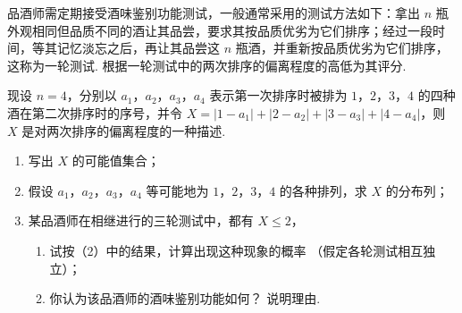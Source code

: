 \begin{problem}
品酒师需定期接受酒味鉴别功能测试，一般通常采用的测试方法如下：拿出 \(n\) 瓶外观相同但品质不同的酒让其品尝，要求其按品质优劣为它们排序；经过一段时间，等其记忆淡忘之后，再让其品尝这 \(n\) 瓶酒，并重新按品质优劣为它们排序，这称为一轮测试. 根据一轮测试中的两次排序的偏离程度的高低为其评分.

现设 \(n = 4\)，分别以 \(a_{1}\)，\(a_{2}\)，\(a_{3}\)，\(a_{4}\) 表示第一次排序时被排为 \(1\)，\(2\)，\(3\)，\(4\) 的四种酒在第二次排序时的序号，并令 \(X = |1 - a_{1}| + |2 - a_{2}| + |3 - a_{3}| + |4 - a_{4}|\)，则 \(X\) 是对两次排序的偏离程度的一种描述.

\begin{enumerate}
\item 写出 \(X\) 的可能值集合；
\item 假设 \(a_{1}\)，\(a_{2}\)，\(a_{3}\)，\(a_{4}\) 等可能地为 \(1\)，\(2\)，\(3\)，\(4\) 的各种排列，求 \(X\) 的分布列；
\item 某品酒师在相继进行的三轮测试中，都有 \(X \leqslant 2\)，
\begin{enumerate}
\item 试按（2）中的结果，计算出现这种现象的概率 （假定各轮测试相互独立）；
\item 你认为该品酒师的酒味鉴别功能如何？ 说明理由.
\end{enumerate}
\end{enumerate}
\end{problem}

